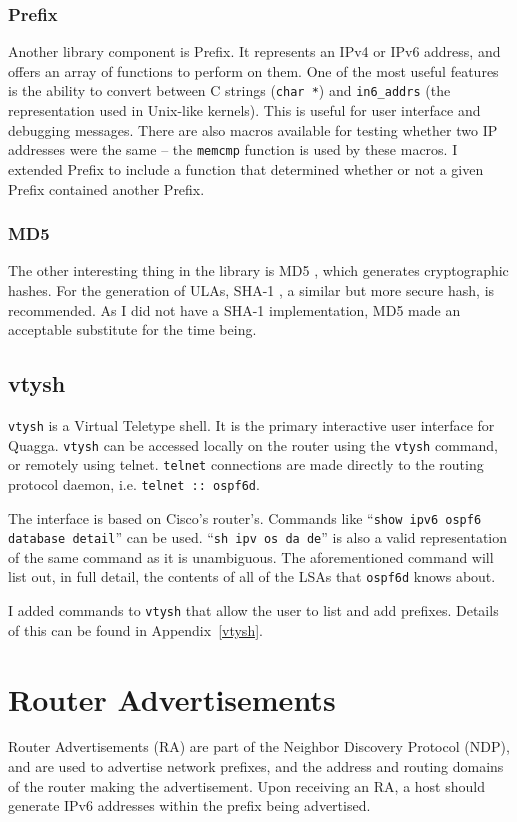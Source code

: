 \documentclass[12pt,a4paper,twoside]{report}
\begin{document}
\subsubsection{Prefix}
Another library component is Prefix. It represents an IPv4 or IPv6 address, and
offers an array of functions to perform on them. One of the most
useful features is the ability to convert between C strings
(\texttt{char *}) and \texttt{in6\_addrs} (the representation used in Unix-like
kernels). This is useful for user interface and debugging messages.
There are also macros available for testing whether two IP addresses were the
same -- the \texttt{memcmp} function is used by these macros. I extended Prefix
to include a function that determined whether or not a given Prefix contained
another Prefix.

\subsubsection{MD5}
The other interesting thing in the library is MD5
, which generates cryptographic
hashes. For the generation of ULAs, SHA-1 , a similar but more secure hash, is recommended. As I did not have
a SHA-1 implementation, MD5 made an acceptable substitute for the time being. 

\subsection{vtysh}
\texttt{vtysh}  is a
Virtual Teletype shell. It is the primary interactive user interface for
Quagga. \texttt{vtysh} can be accessed locally on the router using the
\texttt{vtysh} command, or remotely using telnet. \texttt{telnet} connections
are made directly to the routing protocol daemon, i.e. \texttt{telnet ::
ospf6d}.  

The interface is based on Cisco's router's. Commands like
``\texttt{show ipv6 ospf6 database detail}'' can be used. ``\texttt{sh ipv os
da de}'' is also a valid representation of the same command as it is
unambiguous. The aforementioned command will list out, in full detail, the
contents of all of the LSAs that \texttt{ospf6d} knows about. 

I added commands to \texttt{vtysh} that allow the user to list and add
prefixes. Details of this can be found in Appendix~\ref{vtysh}. 

\section{Router Advertisements}
Router Advertisements (RA)  are part of
the Neighbor Discovery Protocol (NDP),  and are used to advertise network prefixes, and the address and
routing domains of the router making the advertisement. Upon receiving
an RA, a host should generate IPv6 addresses within the prefix being advertised. 
\end{document}
